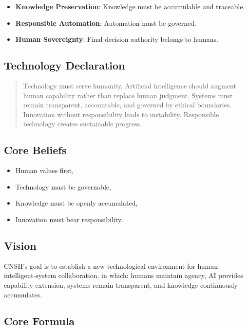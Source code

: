 \documentclass[conference]{IEEEtran}
\begin{document}
\begin{itemize}[nosep]
  \item \textbf{Knowledge Preservation}: Knowledge must be
    accumulable and traceable.
  \item \textbf{Responsible Automation}: Automation must be governed.
  \item \textbf{Human Sovereignty}: Final decision authority
    belongs to humans.
\end{itemize}

\subsection{Technology Declaration}

\begin{quote}
Technology must serve humanity.
Artificial intelligence should augment human capability rather
than replace human judgment.
Systems must remain transparent, accountable, and governed
by ethical boundaries.
Innovation without responsibility leads to instability.
Responsible technology creates sustainable progress.
\end{quote}

\subsection{Core Beliefs}

\begin{itemize}[nosep]
  \item Human values first,
  \item Technology must be governable,
  \item Knowledge must be openly accumulated,
  \item Innovation must bear responsibility.
\end{itemize}

\subsection{Vision}

CNSH's goal is to establish a new technological environment
for human-intelligent-system collaboration, in which:
humans maintain agency, AI provides capability extension,
systems remain transparent, and knowledge continuously accumulates.

\subsection{Core Formula}
\end{document}
